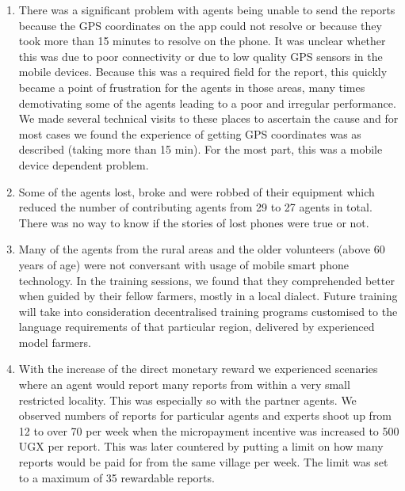 \documentclass[letterpaper]{article} %
\begin{document}
\begin{enumerate}
\item There was a significant problem with agents being unable to send the reports because the GPS coordinates on the app could not resolve or because they took more than 15 minutes to resolve on the phone. It was unclear whether this was due to poor connectivity or due to low quality GPS sensors in the mobile devices. Because this was a required field for the report, this quickly became a point of frustration for the agents in those areas, many times demotivating some of the agents leading to a poor and irregular performance. We made several technical visits to these places to ascertain the cause and for most cases we found the experience of getting GPS coordinates was as described (taking more than 15 min). For the most part, this was a mobile device dependent problem.
\item Some of the agents lost, broke and were robbed of their equipment which reduced the number of contributing agents from 29 to 27 agents in total. There was no way to know if the stories of lost phones were true or not. 
\item Many of the agents from the rural areas and the older volunteers (above 60 years of age) were not conversant with usage of mobile smart phone technology. In the training sessions, we found that they comprehended better when guided by their fellow farmers, mostly in a local dialect.
Future training will take into consideration decentralised training programs customised to the language requirements of that particular region, delivered by experienced model farmers.
\item With the increase of the direct monetary reward we experienced scenaries where an agent would report many reports from within a very small restricted locality. This was especially so with the partner agents. We observed numbers of reports for particular agents and experts shoot up from 12 to over 70 per week when the micropayment incentive was increased to 500 UGX per report. This was later countered by putting a limit on how many reports would be paid for from the same village per week. The limit was set to a maximum of 35 rewardable reports.
\end{enumerate}
\end{document}
